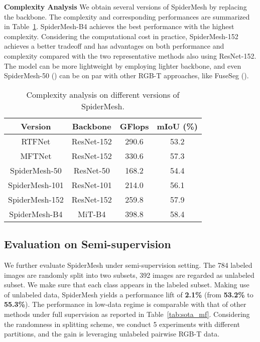 \documentclass[letterpaper, 10 pt, conference]{ieeeconf}
\begin{document}
\textbf{Complexity Analysis} We obtain several versions of SpiderMesh by replacing the backbone. The complexity and corresponding performances are summarized in Table~\ref{tab:complexity}. SpiderMesh-B4 achieves the best performance with the highest complexity. Considering the computational cost in practice, SpiderMesh-152 achieves a better tradeoff and has advantages on both performance and complexity compared with the two representative methods also using ResNet-152. The model can be more lightweight by employing lighter backbone, and even SpiderMesh-50 () can be on par with other RGB-T approaches, like FuseSeg \cite{fuseseg} (). 

\begin{table}[ht]
  \footnotesize
  \centering
  \caption{Complexity analysis on different versions of SpiderMesh.}
  \begin{tabular}{cc|cc} 
  \hline

    \textbf{Version}       & \textbf{Backbone}     &  \textbf{GFlops}      & \textbf{mIoU (\%)}   \\ \hline
    RTFNet\cite{rtfnet}     & ResNet-152   & 290.6       & 53.2        \\
    MFTNet\cite{MFTNet}     & ResNet-152   & 330.6        & 57.3        \\ \hline
    SpiderMesh-50    & ResNet-50    &  168.2       & 54.4        \\
    SpiderMesh-101   & ResNet-101   &  214.0       & 56.1        \\
    SpiderMesh-152   & ResNet-152   &  259.8       & 57.9        \\
    SpiderMesh-B4    & MiT-B4       &  398.8       & 58.4        \\ \hline
  \end{tabular}
  \label{tab:complexity}
\end{table}

\subsection{Evaluation on Semi-supervision}
We further evaluate SpiderMesh under semi-supervision setting. The 784 labeled images are randomly split into two subsets, 392 images are regarded as unlabeled subset. We make sure that each class appears in the labeled subset. Making use of unlabeled data, SpiderMesh yields a performance lift of \textbf{2.1\%} (from \textbf{53.2\%} to \textbf{55.3\%}). The performance in low-data regime is comparable with that of other methods under full supervision as reported in Table~\ref{tab:sota_mf}. Considering the randomness in splitting scheme, we conduct 5 experiments with different partitions, and the gain is  leveraging unlabeled pairwise RGB-T data.
\end{document}
